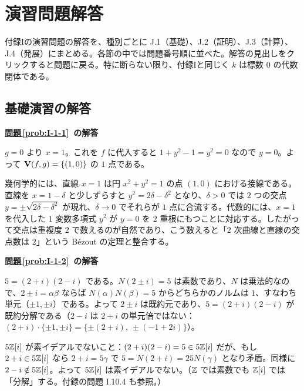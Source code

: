 \chapter{演習問題解答}\label{app:J}

\newcommand{\appJsol}[1]{%
  \par\bigskip\noindent\phantomsection\label{sol:#1}%
  \textbf{\hyperref[prob:#1]{問題\,\ref*{prob:#1}}\ の解答}\par\nopagebreak\smallskip\noindent}

\begin{chapterlead}
付録Iの演習問題の解答を、種別ごとに J.1（基礎）、J.2（証明）、J.3（計算）、J.4（発展）にまとめる。各節の中では問題番号順に並べた。解答の見出しをクリックすると問題に戻る。特に断らない限り、付録Iと同じく $k$ は標数 $0$ の代数閉体である。
\end{chapterlead}

\section{基礎演習の解答}

\appJsol{I-1-1}
$g=0$ より $x=1$。これを $f$ に代入すると $1+y^2-1=y^2=0$ なので $y=0$。よって $\mathbf{V}(f,g)=\{(1,0)\}$ の $1$ 点である。

幾何学的には、直線 $x=1$ は円 $x^2+y^2=1$ の点 $(1,0)$ における接線である。直線を $x=1-\delta$ と少しずらすと $y^2=2\delta-\delta^2$ となり、$\delta>0$ では $2$ つの交点 $y=\pm\sqrt{2\delta-\delta^2}$ が現れ、$\delta\to0$ でそれらが $1$ 点に合流する。代数的には、$x=1$ を代入した $1$ 変数多項式 $y^2$ が $y=0$ を $2$ 重根にもつことに対応する。したがって交点は重複度 $2$ で数えるのが自然であり、こう数えると「$2$ 次曲線と直線の交点数は $2$」という Bézout の定理と整合する。

\appJsol{I-1-2}
$5=(2+i)(2-i)$ である。$N(2\pm i)=5$ は素数であり、$N$ は乗法的なので、$2\pm i=\alpha\beta$ ならば $N(\alpha)N(\beta)=5$ からどちらかのノルムは $1$、すなわち単元（$\pm1,\pm i$）である。よって $2\pm i$ は既約元であり、$5=(2+i)(2-i)$ が既約分解である（$2-i$ は $2+i$ の単元倍ではない：$(2+i)\cdot\{\pm1,\pm i\}=\{\pm(2+i),\ \pm(-1+2i)\}$）。

$5\mathbb{Z}[i]$ が素イデアルでないこと：$(2+i)(2-i)=5\in5\mathbb{Z}[i]$ だが、もし $2+i\in5\mathbb{Z}[i]$ なら $2+i=5\gamma$ で $5=N(2+i)=25N(\gamma)$ となり矛盾。同様に $2-i\notin5\mathbb{Z}[i]$。よって $5\mathbb{Z}[i]$ は素イデアルでない。（$\mathbb{Z}$ では素数でも $\mathbb{Z}[i]$ では「分解」する。付録の問題 I.10.4 も参照。）

